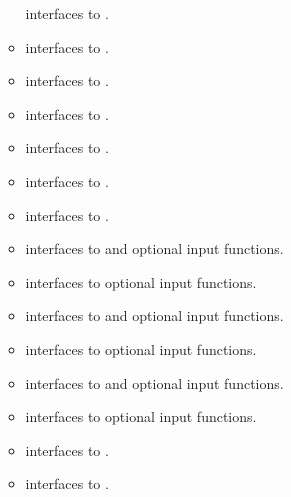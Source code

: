 \begin{itemize}
\begin{itemize}
    interfaces to .
  \item {}
    interfaces to .
  \item {}
    interfaces to .
  \item {}
    interfaces to .
  \item {}
    interfaces to .
  \item {}
    interfaces to .
  \item {}
    interfaces to .
  \item {}
    interfaces to  and {\spgmr} optional input functions.
  \item {}
    interfaces to {\spgmr} optional input functions.
  \item {}
    interfaces to  and {\spbcg} optional input functions.
  \item {}
    interfaces to {\spbcg} optional input functions.
  \item {}
    interfaces to  and {\sptfqmr} optional input functions.
  \item {}
    interfaces to {\sptfqmr} optional input functions.
  \item {}
   interfaces to .
 \item {}
   interfaces to .
 \end{itemize}

\end{itemize}

